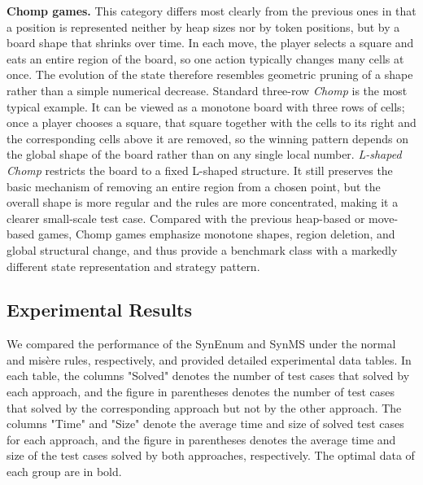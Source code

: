 \documentclass[review]{elsarticle}
\begin{document}
{\color{red}\textbf{Chomp games.} This category differs most clearly from the previous ones in that a position is represented neither by heap sizes nor by token positions, but by a board shape that shrinks over time. 
In each move, the player selects a square and eats an entire region of the board, so one action typically changes many cells at once. 
The evolution of the state therefore resembles geometric pruning of a shape rather than a simple numerical decrease. Standard three-row \emph{Chomp} is the most typical example. 
It can be viewed as a monotone board with three rows of cells; once a player chooses a square, that square together with the cells to its right and the corresponding cells above it are removed, so the winning pattern depends on the global shape of the board rather than on any single local number. 
\emph{L-shaped Chomp} restricts the board to a fixed L-shaped structure. It still preserves the basic mechanism of removing an entire region from a chosen point, but the overall shape is more regular and the rules are more concentrated, making it a clearer small-scale test case. 
Compared with the previous heap-based or move-based games, Chomp games emphasize monotone shapes, region deletion, and global structural change, and thus provide a benchmark class with a markedly different state representation and strategy pattern.}

\subsection{Experimental Results}
We compared the performance of the SynEnum and SynMS under the normal and mis\`{e}re rules, respectively, and provided detailed experimental data tables. In each table,
the columns "Solved" denotes the number of test cases that solved by each approach, and the figure in parentheses denotes the number of test cases that solved by the corresponding approach but not by the other approach.
The columns "Time" and "Size" denote the average time and size of solved test cases for each approach, and the figure in parentheses denotes the average time and size of the test cases solved by both approaches, respectively.
The optimal data of each group are in bold.
\end{document}
